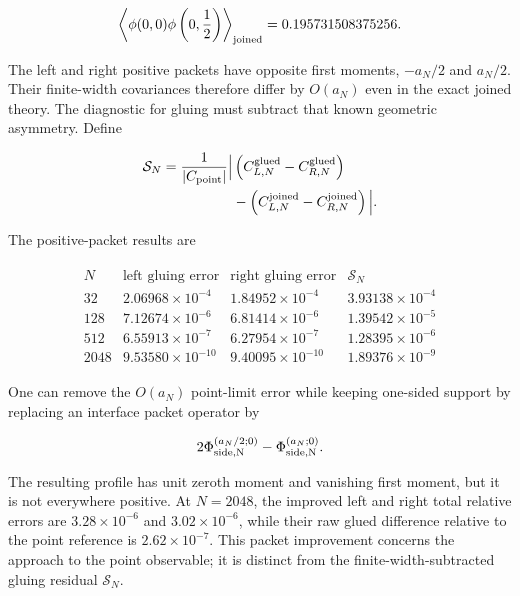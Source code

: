 \begin{align}
\left\langle\phi(0,0)\phi\left(0,\frac12\right)\right\rangle_{\rm joined}
=0.195731508375256.
\end{align}

The left and right positive packets have opposite first moments, $-a_N/2$ and $a_N/2$. Their finite-width covariances therefore differ by $O(a_N)$ even in the exact joined theory. The diagnostic for gluing must subtract that known geometric asymmetry. Define

\begin{align}
\begin{aligned}
\mathcal S_N
=\frac1{|C_{\rm point}|}
\Big|&
\left(C_{L,N}^{\rm glued}-C_{R,N}^{\rm glued}\right)\\
&-\left(C_{L,N}^{\rm joined}-C_{R,N}^{\rm joined}\right)
\Big|.
\end{aligned}
\end{align}

The positive-packet results are

\begin{align}
\begin{array}{c|c|c|c}
N&
\text{left gluing error}&
\text{right gluing error}&
\mathcal S_N\\ \hline
32&2.06968\times10^{-4}&1.84952\times10^{-4}&3.93138\times10^{-4}\\
128&7.12674\times10^{-6}&6.81414\times10^{-6}&1.39542\times10^{-5}\\
512&6.55913\times10^{-7}&6.27954\times10^{-7}&1.28395\times10^{-6}\\
2048&9.53580\times10^{-10}&9.40095\times10^{-10}&1.89376\times10^{-9}
\end{array}
\end{align}

One can remove the $O(a_N)$ point-limit error while keeping one-sided support by replacing an interface packet operator by

\begin{align}
2\Phi_{\rm side,N}^{(a_N/2;0)}
-\Phi_{\rm side,N}^{(a_N;0)}.
\end{align}

The resulting profile has unit zeroth moment and vanishing first moment, but it is not everywhere positive. At $N=2048$, the improved left and right total relative errors are $3.28\times10^{-6}$ and $3.02\times10^{-6}$, while their raw glued difference relative to the point reference is $2.62\times10^{-7}$. This packet improvement concerns the approach to the point observable; it is distinct from the finite-width-subtracted gluing residual $\mathcal S_N$.

